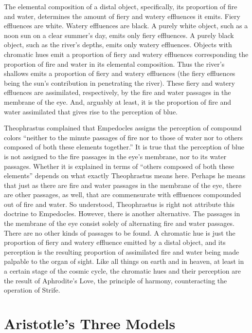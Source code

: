 The elemental composition of a distal object, specifically, its proportion of fire and water, determines the amount of fiery and watery effluences it emits. Fiery effluences are white. Watery effluences are black. A purely white object, such as a noon sun on a clear summer's day, emits only fiery effluences. A purely black object, such as the river's depths, emits only watery effluences. Objects with chromatic hues emit a proportion of fiery and watery effluences corresponding the proportion of fire and water in its elemental composition. Thus the river's shallows emits a proportion of fiery and watery effluences (the fiery effluences being the sun's contribution in penetrating the river). These fiery and watery effluences are assimilated, respectively, by the fire and water passages in the membrane of the eye. And, arguably at least, it is the proportion of fire and water assimilated that gives rise to the perception of blue. 

Theophrastus complained that Empedocles assigns the perception of compound colors ``neither to the minute passages of fire nor to those of water nor to others composed of both these elements together.'' It is true that the perception of blue is not assigned to the fire passages in the eye's membrane, nor to its water passages. Whether it is explained in terms of ``others composed of both these elements'' depends on what exactly Theophrastus means here. Perhaps he means that just as there are fire and water passages in the membrane of the eye, there are other passages, as well, that are commensurate with effluences compounded out of fire and water. So understood, Theophrastus is right not attribute this doctrine to Empedocles. However, there is another alternative. The passages in the membrane of the eye consist solely of alternating fire and water passages. There are no other kinds of passages to be found. A chromatic hue is just the proportion of fiery and watery effluence emitted by a distal object, and its perception is the resulting proportion of assimilated fire and water being made palpable to the organ of sight. Like all things on earth and in heaven, at least in a certain stage of the cosmic cycle, the chromatic hues and their perception are the result of Aphrodite's Love, the principle of harmony, counteracting the operation of Strife. 


\section{Aristotle's Three Models} %
\label{sec:aristotle_s_three_models}

